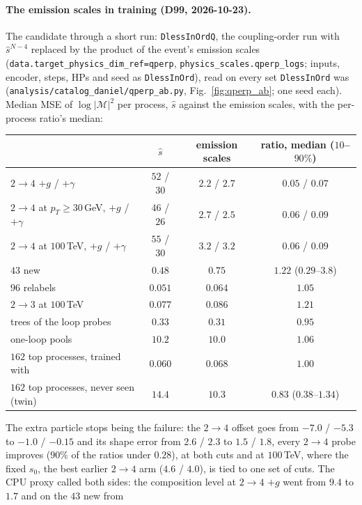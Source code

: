 \documentclass[11pt]{article}
\newcommand{\code}[1]{\texttt{#1}}
\begin{document}
\paragraph{The emission scales in training (D99, 2026-10-23).}\label{par:dimless_qperp} The candidate through a short run:
\code{DlessInOrdQ}, the coupling-order run with $\hat s^{N-4}$ replaced by the product of the event's emission scales
(\code{data.target\_physics\_dim\_ref=qperp}, \code{physics\_scales.qperp\_logs}; inputs, encoder, steps, HPs and seed as
\code{DlessInOrd}), read on every set \code{DlessInOrd} was (\code{analysis/catalog\_daniel/qperp\_ab.py},
Fig.~\ref{fig:qperp_ab}; one seed each). Median MSE of $\log|\mathcal M|^2$ per process, $\hat s$ against the emission
scales, with the per-process ratio's median:
\begin{center}
\begin{tabular}{lccc}
 & $\hat s$ & emission scales & ratio, median ($10$--$90\%$) \\ \hline
$2\to4$ $+g$ / $+\gamma$ & $52$ / $30$ & $2.2$ / $2.7$ & $0.05$ / $0.07$ \\
$2\to4$ at $p_T\geq30$\,GeV, $+g$ / $+\gamma$ & $46$ / $26$ & $2.7$ / $2.5$ & $0.06$ / $0.09$ \\
$2\to4$ at $100$\,TeV, $+g$ / $+\gamma$ & $55$ / $30$ & $3.2$ / $3.2$ & $0.06$ / $0.09$ \\
$43$ new & $0.48$ & $0.75$ & $1.22$ ($0.29$--$3.8$) \\
$96$ relabels & $0.051$ & $0.064$ & $1.05$ \\
$2\to3$ at $100$\,TeV & $0.077$ & $0.086$ & $1.21$ \\
trees of the loop probes & $0.33$ & $0.31$ & $0.95$ \\
one-loop pools & $10.2$ & $10.0$ & $1.06$ \\
$162$ top processes, trained with & $0.060$ & $0.068$ & $1.00$ \\
$162$ top processes, never seen (twin) & $14.4$ & $10.3$ & $0.83$ ($0.38$--$1.34$) \\
\end{tabular}
\end{center}
The extra particle stops being the failure: the $2\to4$ offset goes from $-7.0$ / $-5.3$ to $-1.0$ / $-0.15$ and its
shape error from $2.6$ / $2.3$ to $1.5$ / $1.8$, every $2\to4$ probe improves ($90\%$ of the ratios under $0.28$), at both
cuts and at $100$\,TeV, where the fixed $s_0$, the best earlier $2\to4$ arm ($4.6$ / $4.0$), is tied to one set of cuts.
The CPU proxy called both sides: the composition level at $2\to4$ $+g$ went from $9.4$ to $1.7$ and on the $43$ new from
\end{document}
